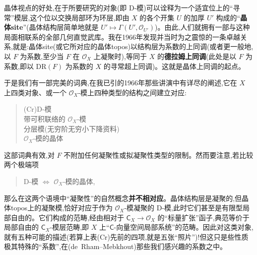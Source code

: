 \noindent 晶体视点的好处,在于所要研究的对象(即 D-模)可以诠释为一个适宜位上的“寻常”模层,这个位以交换局部环为环层,即由 $X$ 的各个开集 $U$ 的加厚 $U'$ 构成的“\textbf{晶体site}”(晶体结构层简单地就是 $U'\mapsto\Gamma(U',\mathcal{O}_{U'})$)。由此,人们就拥有一部与这种局面相联系的全部几何直觉武库。我在1966年发现并当时为之震惊的一条卓越关系,就是:晶体site(或它所对应的晶体topos)以结构层为系数的上同调(或者更一般地,以 $F$ 为系数,至少当 $F$ 在 $\mathcal{O}_{X}$ 上凝聚时),等同于 $X$ 的\textbf{德拉姆上同调}(此处是以 $F$ 为系数,即以 $\mathrm{DR}(F)$ 为系数的 $X$ 的寻常超上同调)。这就是晶体上同调的起点。

\dmark{}于是我们有一部完美的词典,在我已引的1966年那些讲演中有详尽的阐述,它在 $X$ 上四类对象、或一个 $\mathcal{O}_{X}$-模上四种类型的结构之间建立对应:
\begin{quote}
(Cr)\quad D-模\\
\qquad 带可积联络的 $\mathcal{O}_{X}$-模\\
\qquad 分层模(无穷阶无穷小下降资料)\\
\qquad $\mathcal{O}_{X}$-模的晶体
\end{quote}
这部词典有效,对 $F$ 不附加任何凝聚性或拟凝聚性类型的限制。然而要注意,若比较两个极端项
\begin{quote}
D-模 $\Longleftrightarrow$ $\mathcal{O}_{X}$-模的晶体,
\end{quote}
那么在这两个语境中“凝聚性”的自然概念\textbf{并不相对应}。晶体结构层是凝聚的,但晶体topos上的凝聚模,恰好对应于作为 $\mathcal{O}_{X}$-模凝聚的 D-模,此时它们甚至是有限型局部自由的。它们构成的范畴,经由相对于 $\mathsf{C}_{X}\to\mathcal{O}_{X}$ 的“标量扩张”函子,典范等价于局部自由的 $\mathsf{C}_{X}$-模层范畴,即 $X$ 上“$\mathsf{C}$-向量空间局部系统”的范畴。因此对这类对象,就有五种可能的描述(若算上表(Cr)先前的四项,就是五张“照片”)!但这只是些性质极其特殊的“系数”,在(de~Rham--Mebkhout)那些我们感兴趣的系数之中。

